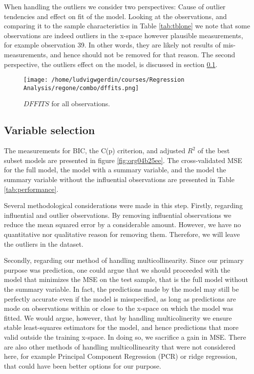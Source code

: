 \documentclass[11pt]{article}
\begin{document}
When handling the outliers we consider two perspectives: Cause of outlier tendencies and effect on fit of 
the model. Looking at the observations, and comparing it to the sample characteristics in Table \ref{tab:tblone}
we note that some observations are indeed outliers in the x-space however 
plausible measurements, for example observation 39. In other words, they are likely not results
of mis-measurements, and hence should not be removed for that reason. The second perspective, the outliers 
effect on the model, is discussed in section \ref{sec:org7f5379d}.

\begin{figure}[h]
\centering
\texttt{[image: /home/ludvigwgerdin/courses/Regression Analysis/regone/combo/dffits.png]}
\caption{\label{fig:org9aee465}
\(DFFITS\) for all observations.}
\end{figure}

\subsection{Variable selection}
\label{sec:org7f5379d}

The measurements for BIC, the C(p) criterion, and adjusted \(R^2\) of the best subset models are presented
in figure \ref{fig:org04b25ee}. The cross-validated MSE for the full model, the model with a summary variable, 
and the model the summary variable without the influential observations are presented in Table
\ref{tab:performance}. 

Several methodological considerations were made in this step. Firstly, regarding influential and outlier 
observations. By removing influential observations we reduce the mean squared error by a considerable amount.
However, we have no quantitative nor qualitative reason for removing them. Therefore, we will leave the 
outliers in the dataset. 

Secondly, regarding our method of handling multicollinearity. Since our primary purpose was prediction, 
one could argue that we should proceeded with the model that minimizes the MSE on the test sample, that is
the full model without the summary variable. In fact, the predictions made by the model may still be 
perfectly accurate even if the model is misspecified, as long as predictions are mode on observations within or
close to the x-space on which the model was fitted. \cite{Montgomery2012} We would argue, however, that by
handling multicolinerity we ensure stable least-squares estimators for the model, and hence predictions  
that more valid outside the training x-space. In doing so, we sacrifice a gain in MSE. 
There are also other methods of handling multicollinearity that were not considered here, for example
Principal Component Regression (PCR) or ridge regression, that could have been better 
options for our purpose.
\end{document}
